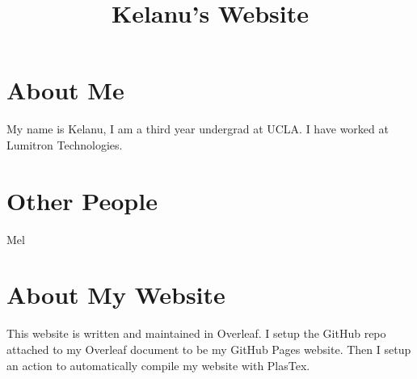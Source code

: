 \documentclass{article}
\title{Kelanu's Website}
\begin{document}
\maketitle
\section{About Me}
My name is Kelanu, I am a third year undergrad at UCLA. I have worked at Lumitron Technologies.

\section{Other People}
Mel

\section{About My Website}
This website is written and maintained in Overleaf. I setup the GitHub repo attached to my Overleaf document to be my GitHub Pages website. Then I setup an action to automatically compile my website with PlasTex.
\end{document}
